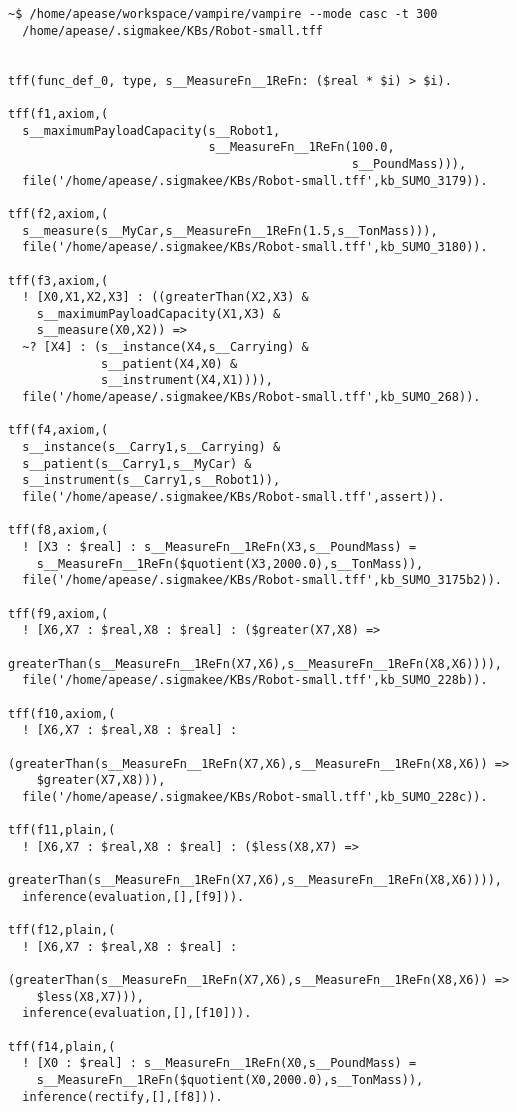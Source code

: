 \documentclass{article}
\begin{document}
\begin{verbatim}
~$ /home/apease/workspace/vampire/vampire --mode casc -t 300 
  /home/apease/.sigmakee/KBs/Robot-small.tff


tff(func_def_0, type, s__MeasureFn__1ReFn: ($real * $i) > $i).

tff(f1,axiom,(
  s__maximumPayloadCapacity(s__Robot1,
                            s__MeasureFn__1ReFn(100.0,
                                                s__PoundMass))),
  file('/home/apease/.sigmakee/KBs/Robot-small.tff',kb_SUMO_3179)).

tff(f2,axiom,(
  s__measure(s__MyCar,s__MeasureFn__1ReFn(1.5,s__TonMass))),
  file('/home/apease/.sigmakee/KBs/Robot-small.tff',kb_SUMO_3180)).

tff(f3,axiom,(
  ! [X0,X1,X2,X3] : ((greaterThan(X2,X3) & 
    s__maximumPayloadCapacity(X1,X3) & 
    s__measure(X0,X2)) => 
  ~? [X4] : (s__instance(X4,s__Carrying) & 
             s__patient(X4,X0) & 
             s__instrument(X4,X1)))),
  file('/home/apease/.sigmakee/KBs/Robot-small.tff',kb_SUMO_268)).

tff(f4,axiom,(
  s__instance(s__Carry1,s__Carrying) & 
  s__patient(s__Carry1,s__MyCar) & 
  s__instrument(s__Carry1,s__Robot1)),
  file('/home/apease/.sigmakee/KBs/Robot-small.tff',assert)).

tff(f8,axiom,(
  ! [X3 : $real] : s__MeasureFn__1ReFn(X3,s__PoundMass) = 
    s__MeasureFn__1ReFn($quotient(X3,2000.0),s__TonMass)),
  file('/home/apease/.sigmakee/KBs/Robot-small.tff',kb_SUMO_3175b2)).

tff(f9,axiom,(
  ! [X6,X7 : $real,X8 : $real] : ($greater(X7,X8) => 
    greaterThan(s__MeasureFn__1ReFn(X7,X6),s__MeasureFn__1ReFn(X8,X6)))),
  file('/home/apease/.sigmakee/KBs/Robot-small.tff',kb_SUMO_228b)).

tff(f10,axiom,(
  ! [X6,X7 : $real,X8 : $real] : 
    (greaterThan(s__MeasureFn__1ReFn(X7,X6),s__MeasureFn__1ReFn(X8,X6)) =>
    $greater(X7,X8))),
  file('/home/apease/.sigmakee/KBs/Robot-small.tff',kb_SUMO_228c)).

tff(f11,plain,(
  ! [X6,X7 : $real,X8 : $real] : ($less(X8,X7) => 
    greaterThan(s__MeasureFn__1ReFn(X7,X6),s__MeasureFn__1ReFn(X8,X6)))),
  inference(evaluation,[],[f9])).

tff(f12,plain,(
  ! [X6,X7 : $real,X8 : $real] : 
    (greaterThan(s__MeasureFn__1ReFn(X7,X6),s__MeasureFn__1ReFn(X8,X6)) => 
    $less(X8,X7))),
  inference(evaluation,[],[f10])).

tff(f14,plain,(
  ! [X0 : $real] : s__MeasureFn__1ReFn(X0,s__PoundMass) = 
    s__MeasureFn__1ReFn($quotient(X0,2000.0),s__TonMass)),
  inference(rectify,[],[f8])).


\end{verbatim}
\end{document}
